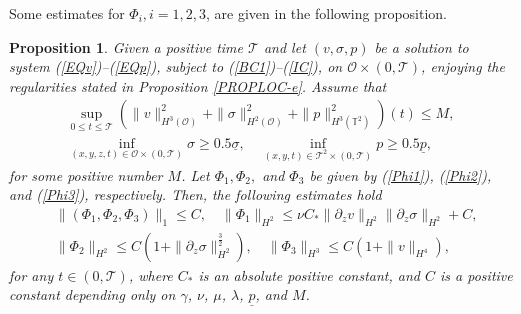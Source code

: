 \documentclass[12pt,reqno]{amsart}
\numberwithin{equation}{section}
\newtheorem{proposition}[theorem]{Proposition}
\begin{document}
Some estimates for $\Phi_i, i=1,2,3$, are given in the following proposition.

\begin{proposition}
\label{PROP-ESTPhis}
Given a positive time $\mathcal T$ and let $(v,\sigma, p)$ be a solution to system (\ref{EQv})--(\ref{EQp}), subject to (\ref{BC1})--(\ref{IC}), on $\mathcal O\times(0,\mathcal T)$, enjoying the regularities
stated in Proposition \ref{PROPLOC-e}. Assume that
\begin{eqnarray}
  \sup_{0\leq t\leq\mathcal T}\left(\|v\|_{H^3(\mathcal O)}^2+\|\sigma\|_{H^2(\mathcal O)}^2+\|p\|_{H^3(\mathbb T^2)}^2\right)(t)\leq M,  \label{ASSUM-APRM}\\
  \inf_{(x,y,z,t)\in\mathcal O\times(0,\mathcal T)}\sigma\geq 0.5\underline\sigma,\quad \inf_{(x,y,t)\in\mathcal T^2\times(0,\mathcal T)}
  p\geq 0.5\underline p,\label{ASSUM-LBsp}
\end{eqnarray}
for some positive number $M$.
Let $\Phi_1, \Phi_2,$ and $\Phi_3$ be given by (\ref{Phi1}),
(\ref{Phi2}), and (\ref{Phi3}), respectively.
Then, the following estimates hold
\begin{align*}
  &\|(\Phi_1, \Phi_2, \Phi_3)\|_1\leq C, \quad \|\Phi_1\|_{H^2}\leq \nu C_*\|\partial_zv\|_{H^2}\|\partial_z\sigma\|_{H^2}+C,
  \\
  &\|\Phi_2\|_{H^2}\leq C\left(1+\|\partial_z\sigma\|_{H^2}^\frac32\right), \quad
  \|\Phi_3\|_{H^3}\leq C(1+\|v\|_{H^4}),
\end{align*}
for any $t\in(0,\mathcal T)$,
where $C_*$ is an absolute positive constant, and $C$ is a positive constant depending only on $\gamma$, $\nu$, $\mu$,
$\lambda$, $\underline p$, and $M$.
\end{proposition}
\end{document}
